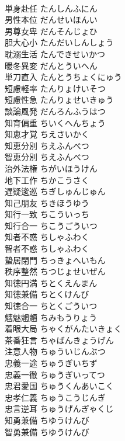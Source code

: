 \documentclass[8pt]{extreport}
\begin{document}
\begin{CJK}{UTF8}{min}
\\	単身赴任	たんしんふにん	
\\	男性本位	だんせいほんい	
\\	男尊女卑	だんそんじょひ	
\\	胆大心小	たんだいしんしょう	
\\	耽溺生活	たんできせいかつ	
\\	暖冬異変	だんとういへん	
\\	単刀直入	たんとうちょくにゅう	
\\	短慮軽率	たんりょけいそつ	
\\	短慮性急	たんりょせいきゅう	
\\	談論風発	だんろんふうはつ	
\\	知育偏重	ちいくへんちょう	
\\	知恵才覚	ちえさいかく	
\\	知恵分別	ちえふんべつ	
\\	智恵分別	ちえふんべつ	
\\	治外法権	ちがいほうけん	
\\	地下工作	ちかこうさく	
\\	遅疑逡巡	ちぎしゅんじゅん	
\\	知己朋友	ちきほうゆう	
\\	知行一致	ちこういっち	
\\	知行合一	ちこうごういつ	
\\	知者不惑	ちしゃふわく	
\\	智者不惑	ちしゃふわく	
\\	蟄居閉門	ちっきょへいもん	
\\	秩序整然	ちつじょせいぜん	
\\	知徳円満	ちとくえんまん	
\\	知徳兼備	ちとくけんび	
\\	知徳合一	ちとくごういつ	
\\	魑魅魍魎	ちみもうりょう	
\\	着眼大局	ちゃくがんたいきょく	
\\	茶番狂言	ちゃばんきょうげん	
\\	注意人物	ちゅういじんぶつ	
\\	忠義一途	ちゅうぎいちず	
\\	忠義一徹	ちゅうぎいってつ	
\\	忠君愛国	ちゅうくんあいこく	
\\	忠孝仁義	ちゅうこうじんぎ	
\\	忠言逆耳	ちゅうげんぎゃくじ	
\\	知勇兼備	ちゆうけんび	
\\	智勇兼備	ちゆうけんび	

\end{CJK}
\end{document}
